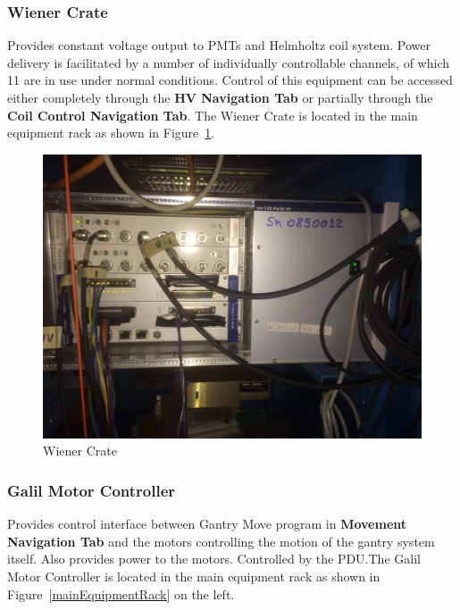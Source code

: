 \documentclass[twoside,letterpaper]{refart}
\newcommand{\picwidth}{0.7 \textwidth}
\begin{document}
\FloatBarrier

\subsubsection{Wiener Crate}

Provides constant voltage output to PMTs and Helmholtz coil system. Power delivery is facilitated by a number of individually controllable channels, of which 11 are in use under normal conditions. Control of this equipment can be accessed either completely through the \textbf{HV Navigation Tab} or partially through the \textbf{Coil Control Navigation Tab}. The Wiener Crate is located in the main equipment rack as shown in Figure~\ref{wiener}.

\FloatBarrier

\begin{figure}[!htpb]\centering	
	\includegraphics[width=\picwidth]{images/wiener}
	\caption{Wiener Crate\label{wiener}}
\end{figure}

\FloatBarrier

\clearpage

\subsubsection{Galil Motor Controller}

Provides control interface between Gantry Move program in \textbf{Movement Navigation Tab} and the motors controlling the motion of the gantry system itself. Also provides power to the motors. Controlled by the PDU.\@ The Galil Motor Controller is located in the main equipment rack as shown in Figure~\ref{mainEquipmentRack} on the left.
\end{document}
